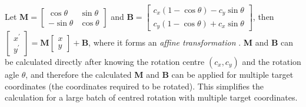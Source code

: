 Let $ \textbf{M} = \begin{bmatrix} \cos\theta & \sin\theta \\ -\sin\theta & \cos\theta \end{bmatrix} $
and $ \textbf{B} = \begin{bmatrix} c_{x}(1 - \cos\theta) - c_{y}\sin\theta \\ c_{y}(1 - \cos\theta) + c_{x}\sin\theta \end{bmatrix}$, then $ \begin{bmatrix} x^{'} \\ y^{'} \end{bmatrix}  = \textbf{M} \begin{bmatrix} x \\ y \end{bmatrix} + \textbf{B}$,
where it forms an \textit{affine transformation} \cite{WolframAT}. \textbf{M} and \textbf{B} can be calculated directly after knowing the rotation centre $(c_{x}, c_{y})$ and the
rotation agle $\theta$, and therefore the calculated \textbf{M} and  \textbf{B} can be applied for multiple target coordinates (the coordinates required to be rotated). This simplifies the calculation for a large batch of centred rotation with multiple target coordinates.



